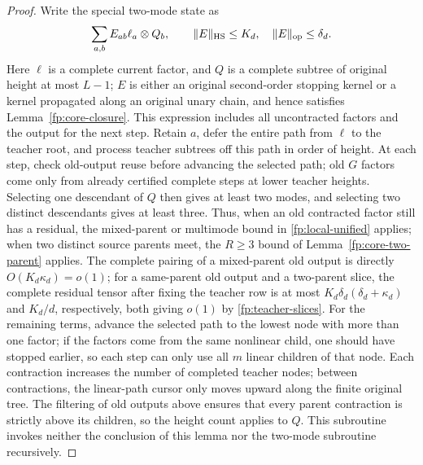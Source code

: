 \documentclass[a4paper]{tufte-handout}
\begin{document}
\begin{fullwidth}
\begin{proof}
Write the special two-mode state as
\begin{equation}\label{fp:marked-state}
 \sum_{a,b}E_{ab}\ell_a\otimes Q_b,
 \qquad \|E\|_{\rm HS}\le K_d,\quad\|E\|_{\rm op}\le\delta_d.
\end{equation}
Here $\ell$ is a complete current factor, and $Q$ is a complete subtree of original height at most $L-1$;
$E$ is either an original second-order stopping kernel or a kernel propagated along an original unary chain, and hence satisfies Lemma~\ref{fp:core-closure}.
This expression includes all uncontracted factors and the output for the next step.
Retain $a$, defer the entire path from $\ell$ to the teacher root, and process teacher subtrees off this path in order of height.
At each step, check old-output reuse before advancing the selected path; old $G$ factors come only from already certified complete steps at lower teacher heights.
Selecting one descendant of $Q$ then gives at least two modes, and selecting two distinct descendants gives at least three.
Thus, when an old contracted factor still has a residual, the mixed-parent or multimode bound in \eqref{fp:local-unified} applies;
when two distinct source parents meet, the $R\ge3$ bound of Lemma~\ref{fp:core-two-parent} applies.
The complete pairing of a mixed-parent old output is directly $O(K_d\kappa_d)=o(1)$;
for a same-parent old output and a two-parent slice, the complete residual tensor after fixing the teacher row is at most
$K_d\delta_d(\delta_d+\kappa_d)$ and $K_d/d$, respectively, both giving $o(1)$ by \eqref{fp:teacher-slices}.
For the remaining terms, advance the selected path to the lowest node with more than one factor; if the factors come from the same nonlinear child,
one should have stopped earlier, so each step can only use all $m$ linear children of that node.
Each contraction increases the number of completed teacher nodes; between contractions, the linear-path cursor only moves upward along the finite original tree.
The filtering of old outputs above ensures that every parent contraction is strictly above its children, so the height count applies to $Q$.
This subroutine invokes neither the conclusion of this lemma nor the two-mode subroutine recursively.


\end{proof}
\end{fullwidth}
\end{document}
